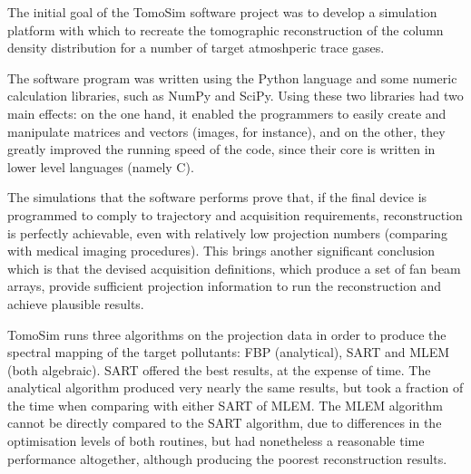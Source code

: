 The initial goal of the TomoSim software project was to develop a
simulation platform with which to recreate the tomographic
reconstruction of the column density distribution for a number of target
atmoshperic trace gases.

The software program was written using the Python language and some
numeric calculation libraries, such as NumPy and SciPy. Using these two
libraries had two main effects: on the one hand, it enabled the
programmers to easily create and manipulate matrices and vectors
(images, for instance), and on the other, they greatly improved the
running speed of the code, since their core is written in lower level
languages (namely C).

The simulations that the software performs prove that, if the final
device is programmed to comply to trajectory and acquisition
requirements, reconstruction is perfectly achievable, even with
relatively low projection numbers (comparing with medical imaging
procedures). This brings another significant conclusion which is that
the devised acquisition definitions, which produce a set of fan beam
arrays, provide sufficient projection information to run the
reconstruction and achieve plausible results.

TomoSim runs three algorithms on the projection data in order to produce
the spectral mapping of the target pollutants: FBP (analytical), SART and
MLEM (both algebraic). SART offered the best results, at the expense of
time. The analytical algorithm produced very nearly the same results,
but took a fraction of the time when comparing with either SART of MLEM.
The MLEM algorithm cannot be directly compared to the SART algorithm,
due to differences in the optimisation levels of both routines, but had
nonetheless a reasonable time performance altogether, although producing
the poorest reconstruction results.

